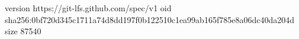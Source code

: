 version https://git-lfs.github.com/spec/v1
oid sha256:0bf720d345c1711a74d8dd197f0b122510c1ea99ab165f785e8a06dc40da204d
size 87540
